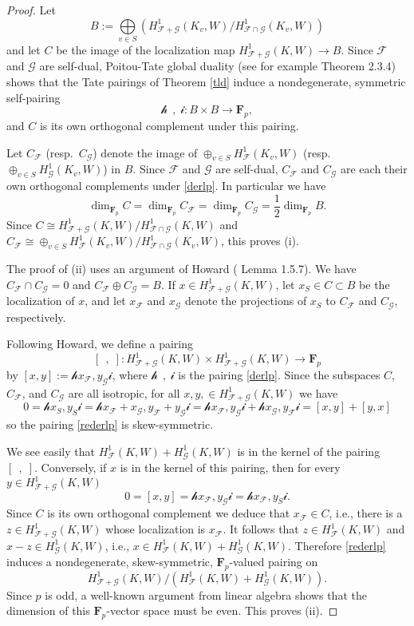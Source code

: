 \documentclass[reqno]{amsart}
\theoremstyle{definition}
\def\F{\mathbf{F}}
\def\Fp{\F_p}
\def\cF{\mathcal{F}}
\def\cG{\mathcal{G}}
\def\T{W}
\def\ld{\mathcal{h}}
\def\rd{\mathcal{i}}
\def\too{\longrightarrow}
\def\Hs#1{H^1_{#1}}
\def\HF{\Hs{\cF}}
\def\HG{\Hs{\cG}}
\def\dirsum#1{\underset{#1}{\textstyle\bigoplus}}
\def\rf{\Fp}
\def\pair#1#2{\ld#1,#2\rd}
\begin{document}
\begin{proof}
Let 
$$
B := \dirsum{v \in S}(\Hs{\cF+\cG}(K_v,\T)/\Hs{\cF\cap\cG}(K_v,\T))
$$ 
and let $C$ be the image of the localization map $\Hs{\cF+\cG}(K,\T) \to B$.
Since $\cF$ and $\cG$ are self-dual, 
Poitou-Tate global duality (see for example \cite{kolysys} Theorem 2.3.4)
shows that 
the Tate pairings of Theorem \ref{tld} induce a nondegenerate, symmetric self-pairing 
\begin{equation}
\label{derlp}
\pair{\;\,}{\;} : B \times B \too \Fp,
\end{equation}
and $C$ is its own orthogonal complement under this pairing.  

Let $C_\cF$ (resp.\ $C_\cG$) denote the image of $\oplus_{v \in S}\HF(K_v,\T)$ 
(resp.\ $\oplus_{v \in S}\HG(K_v,\T)$) in $B$.
Since $\cF$ and $\cG$ are self-dual, $C_\cF$ and $C_\cG$ are 
each their own orthogonal complements under \eqref{derlp}.  
In particular we have
$$
\dim_{\rf}C = \dim_{\rf}C_\cF = \dim_{\rf}C_\cG = \textstyle\frac{1}{2}\dim_{\rf}B.
$$
Since $C \cong \Hs{\cF+\cG}(K,\T)/\Hs{\cF\cap\cG}(K,\T)$ and 
$C_\cF \cong \oplus_{v \in S}\HF(K_v,\T)/\Hs{\cF\cap\cG}(K_v,\T)$, this proves (i).

The proof of (ii) uses an argument of Howard (\cite{howard} Lemma 1.5.7).  
We have $C_\cF \cap C_\cG = 0$ and $C_\cF \oplus C_\cG = B$.  
If $x \in \Hs{\cF+\cG}(K,\T)$, let $x_S \in C \subset B$ be the 
localization of $x$, and let $x_\cF$ and $x_\cG$ denote 
the projections of $x_S$ to $C_\cF$ and $C_\cG$, respectively.  

Following Howard, we define a pairing 
\begin{equation}
\label{rederlp}
[\;\,,\;] : \Hs{\cF+\cG}(K,\T) \times \Hs{\cF+\cG}(K,\T) \too \Fp
\end{equation}
by $[x,y] := \pair{x_\cF}{y_\cG}$, where $\pair{\;\,}{\;}$ is the pairing 
\eqref{derlp}.
Since the subspaces $C$, $C_\cF$, and $C_\cG$ are all isotropic, 
for all $x, y, \in \Hs{\cF+\cG}(K,\T)$ we have
$$
0 = \pair{x_S}{y_S} = \pair{x_\cF+x_\cG}{y_\cF+y_\cG} 
    = \pair{x_\cF}{y_\cG} + \pair{x_\cG}{y_\cF} 
    = [x,y] + [y,x]
$$
so the pairing \eqref{rederlp} is skew-symmetric.  

We see easily that $\HF(K,\T) + \HG(K,\T)$ is in the kernel of the pairing $[\;\,,\;]$.  
Conversely, 
if $x$ is in the kernel of this pairing, then 
for every $y \in \Hs{\cF+\cG}(K,\T)$
$$
0 = [x,y] = \pair{x_\cF}{y_\cG} = \pair{x_\cF}{y_S}.
$$
Since $C$ is its own orthogonal complement we deduce that $x_\cF \in C$, 
i.e., there is a $z \in \Hs{\cF+\cG}(K,\T)$ 
whose localization is $x_\cF$.  It follows that $z \in \HF(K,\T)$ 
and $x-z \in \HG(K,\T)$, i.e., $x \in \HF(K,\T) + \HG(K,\T)$.  
Therefore \eqref{rederlp} induces a nondegenerate, skew-symmetric, $\Fp$-valued 
pairing on $$\Hs{\cF+\cG}(K,\T)/(\HF(K,\T) + \HG(K,\T)).$$ 
Since $p$ is odd, a well-known argument from linear algebra shows that 
the dimension of this $\Fp$-vector space must be even.  This proves (ii).
\end{proof}
\end{document}
